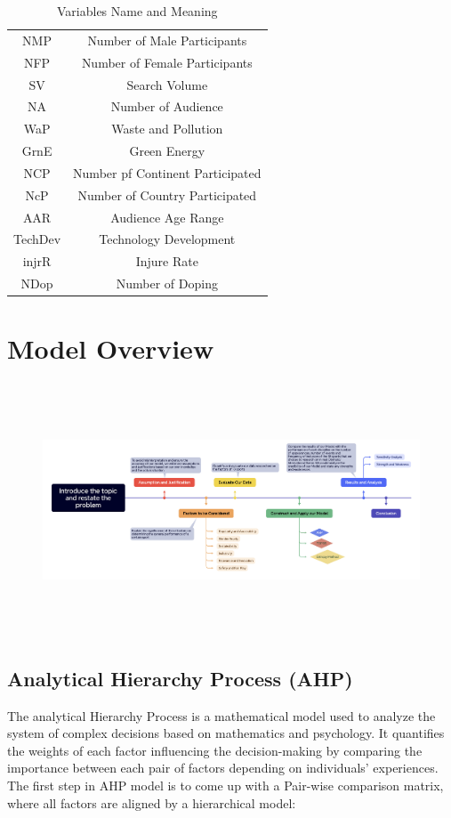 \documentclass[12pt]{article}
\begin{document}
\begin{table}[H] %
    \centering
    \begin{tabular}{c|c}
      NMP & Number of Male Participants \\
      NFP & Number of Female Participants \\
      SV & Search Volume \\
      NA & Number of Audience \\
      WaP & Waste and Pollution \\
      GrnE & Green Energy \\
      NCP & Number pf Continent Participated \\
      NcP & Number of Country Participated \\
      AAR & Audience Age Range \\
      TechDev & Technology Development \\
      injrR & Injure Rate \\
      NDop & Number of Doping \\
    \end{tabular}
    \caption{Variables Name and Meaning}
    \label{tab:my_label}
\end{table}

\section{Model Overview}
    \begin{figure}[H]
    \centering
    \includegraphics[width=1\textwidth, height=7.5cm]{Introduce.png}
    \caption{\label{fig:Introduce} }
\end{figure}
\subsection{Analytical Hierarchy Process (AHP)}
The analytical Hierarchy Process is a mathematical model used to analyze the system of complex decisions based on mathematics and psychology. It quantifies the weights of each factor influencing the decision-making by comparing the importance between each pair of factors depending on individuals’ experiences. 
The first step in AHP model is to come up with a Pair-wise comparison matrix, where all factors are aligned by a hierarchical model:
\end{document}
